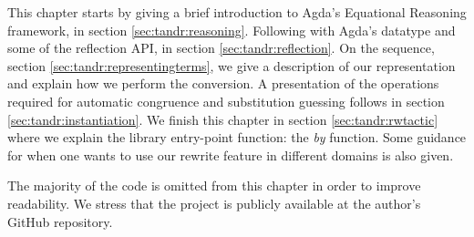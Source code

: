 This chapter starts by giving a brief introduction to Agda's Equational Reasoning framework, in section \ref{sec:tandr:reasoning}. Following with Agda's  datatype and some of the reflection API, in section \ref{sec:tandr:reflection}. 
On the sequence, section \ref{sec:tandr:representingterms}, we give a description of our  representation
and explain how we perform the conversion. A presentation of the operations required for 
automatic congruence and substitution guessing follows in section \ref{sec:tandr:instantiation}.
We finish this chapter in section \ref{sec:tandr:rwtactic} where we explain the library entry-point function: the \emph{by} function.
Some guidance for when one wants to use our rewrite feature in different domains is also given.

The majority of the code is omitted from this chapter in order to improve readability. We
stress that the project is publicly available at the author's GitHub repository.
